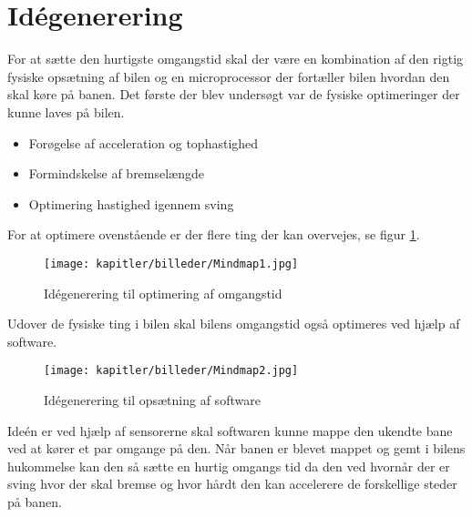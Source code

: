 
\newpage
\section{Idégenerering}
For at sætte den hurtigste omgangstid skal der være en kombination af den rigtig fysiske opsætning af bilen og en microprocessor der fortæller bilen hvordan den skal køre på banen. Det første der blev undersøgt var de fysiske optimeringer der kunne laves på bilen.
\begin{itemize}
\item Forøgelse af acceleration og tophastighed
\item Formindskelse af bremselængde
\item Optimering hastighed igennem sving
\end{itemize}
For at optimere ovenstående er der flere ting der kan overvejes, se figur \ref{fig:mindmap1}.

\begin{figure}[ht]
    \centering
    \texttt{[image: kapitler/billeder/Mindmap1.jpg]}
    \caption{Idégenerering til optimering af omgangstid}
    \label{fig:mindmap1}
\end{figure}

Udover de fysiske ting i bilen skal bilens omgangstid også optimeres ved hjælp af software.


\newpage

\begin{figure}[ht]
    \centering
    \texttt{[image: kapitler/billeder/Mindmap2.jpg]}
    \caption{Idégenerering til opsætning af software}
    \label{fig:mindmap2}
\end{figure}


Ideén er ved hjælp af sensorerne skal softwaren kunne mappe den ukendte bane ved at kører et par omgange på den. Når banen er blevet mappet og gemt i bilens hukommelse kan den så sætte en hurtig omgangs tid da den ved hvornår der er sving hvor der skal bremse og hvor hårdt den kan accelerere de forskellige steder på banen.
